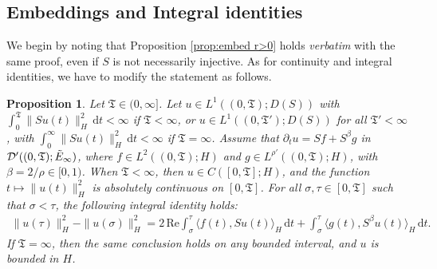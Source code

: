 \documentclass[11pt, letterpaper]{amsart}
\newtheorem{prop}[thm]{Proposition}
\theoremstyle{definition}
\theoremstyle{remark}
\numberwithin{equation}{section}
\begin{document}
\subsection{Embeddings and Integral identities}
We begin by noting that Proposition \ref{prop:embed r>0} holds \textit{verbatim} with the same proof, even if $S$ is not necessarily injective. As for continuity and integral identities, we have to modify the statement as follows.
\begin{prop}\label{prop:energyboundedintervalinhomo}
Let $\mathfrak{T} \in (0, \infty]$. Let $u \in L^1((0, \mathfrak{T}); D(S))$ with  $
\int_0^{\mathfrak{T}} \| S u(t) \|_H^2 \, \mathrm{d}t < \infty$
if $\mathfrak{T} < \infty$, or $u \in L^1((0, \mathfrak{T}'); D(S))$ for all $\mathfrak{T}' < \infty$,
with $\int_0^{\infty} \| S u(t) \|_H^2 \, \mathrm{d}t < \infty$ if $\mathfrak{T} = \infty$. Assume that $ \partial_t u = S f + S^\beta g $ in $\mathcal{D}'((0, \mathfrak{T}); \Tilde{E}_{\infty}) $, where $f \in L^2((0, \mathfrak{T}); H)$ and $g \in L^{\rho'}((0, \mathfrak{T}); H)$, with ${\beta} = {2}/{\rho} \in [0, 1)$. When $\mathfrak{T} < \infty$, then $u \in C([0, \mathfrak{T}]; H)$, and the function $t \mapsto \|u(t)\|_H^2$ is absolutely continuous on $[0, \mathfrak{T}]$. For all $\sigma, \tau \in [0, \mathfrak{T}]$ such that $\sigma < \tau$, the following integral identity holds:
\begin{align*}
    \| u(\tau) \|_H^2 - \| u(\sigma) \|_H^2 = 2 \, \mathrm{Re} \int_{\sigma}^{\tau} \langle f(t), S u(t) \rangle_H \, \mathrm{d}t
    + \int_{\sigma}^{\tau} \langle g(t), S^\beta u(t) \rangle_H \, \mathrm{d}t.
\end{align*}
If $\mathfrak{T} = \infty$, then the same conclusion holds on any bounded interval, and $u$ is bounded in $H$.
\end{prop}
\end{document}
